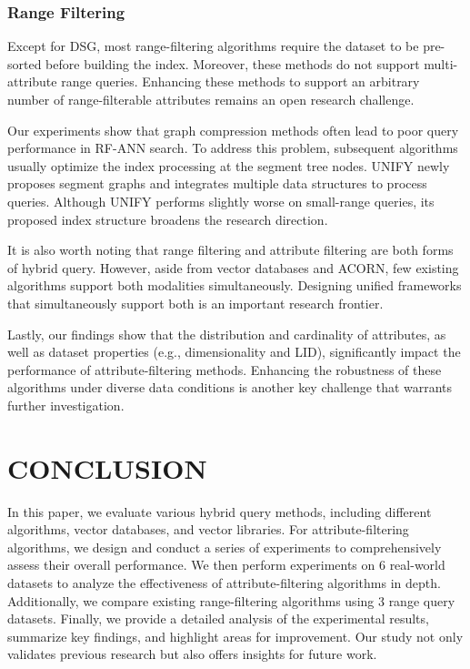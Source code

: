 \documentclass[sigconf, nonacm]{acmart}
\begin{document}
\subsubsection{\textbf{Range Filtering}}

Except for DSG, most range-filtering algorithms require the dataset to be pre-sorted before building the index. Moreover, these methods do not support multi-attribute range queries. Enhancing these methods to support an arbitrary number of range-filterable attributes remains an open research challenge.

Our experiments show that graph compression methods often lead to poor query performance in RF-ANN search. To address this problem, subsequent algorithms usually optimize the index processing at the segment tree nodes. UNIFY newly proposes segment graphs and integrates multiple data structures to process queries. Although UNIFY performs slightly worse on small-range queries, its proposed index structure broadens the research direction.

It is also worth noting that range filtering and attribute filtering are both forms of hybrid query. However, aside from vector databases and ACORN, few existing algorithms support both modalities simultaneously. Designing unified frameworks that simultaneously support both is an important research frontier. 

Lastly, our findings show that the distribution and cardinality of attributes, as well as dataset properties (e.g., dimensionality and LID), significantly impact the performance of attribute-filtering methods. Enhancing the robustness of these algorithms under diverse data conditions is another key challenge that warrants further investigation.


\section{CONCLUSION}

In this paper, we evaluate various hybrid query methods, including different algorithms, vector databases, and vector libraries. For attribute-filtering algorithms, we design and conduct a series of experiments to comprehensively assess their overall performance. We then perform experiments on 6 real-world datasets to analyze the effectiveness of attribute-filtering algorithms in depth. Additionally, we compare existing range-filtering algorithms using 3 range query datasets. Finally, we provide a detailed analysis of the experimental results, summarize key findings, and highlight areas for improvement. Our study not only validates previous research but also offers insights for future work.



\clearpage



\end{document}
